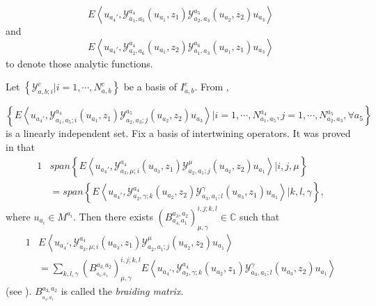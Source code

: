 \documentclass{article}
\begin{document}
	\[
	E\left\langle u_{a_{4}'},\mathcal{Y}_{a_{1},a_{5}}^{a_{4}}\left(u_{a_{1}},z_{1}\right)\mathcal{Y}_{a_{2},a_{3}}^{a_{5}}\left(u_{a_{2}},z_{2}\right)u_{a_{3}}\right\rangle
	\]
	and
	\[
	E\left\langle u_{a_{4}'},\mathcal{Y}_{a_{2},a_{6}}^{a_{4}}\left(u_{a_{1}},z_{2}\right)\mathcal{Y}_{a_{1},a_{3}}^{a_{6}}\left(u_{a_{1}},z_{1}\right)u_{a_{3}}\right\rangle
	\]
	to denote those analytic functions.
	
	Let $\left\{ \mathcal{Y}_{a,b;i}^{c}|i=1,\cdots,N_{a,b}^{c}\right\} $
	be a basis of $I_{a,b}^{c}$. From \cite{H2},
	
	\[
	\left\{ E\left\langle u_{a_{4}'},\mathcal{Y}_{a_{1},a_{5};i}^{a_{4}}\left(u_{a_{1}},z_{1}\right)\mathcal{Y}_{a_{2},a_{3};j}^{a_{5}}\left(u_{a_{2}},z_{2}\right)u_{a_{3}}\right\rangle |i=1,\cdots,N_{a_{1},a_{5}}^{a_{4}},j=1,\cdots,N_{a_{2},a_{3}}^{a_{5}},\forall a_{5}\right\}
	\]
	is a linearly independent set. Fix a basis of intertwining operators.
	It was proved in \cite{KZ,TK} that
	\begin{alignat*}{1}
		& span\left\{ E\left\langle u_{a_{4}'},\mathcal{Y}_{a_{3},\mu;i}^{a_{4}}\left(u_{a_{3}},z_{1}\right)\mathcal{Y}_{a_{2},a_{1};j}^{\mu}\left(u_{a_{2}},z_{2}\right)u_{a_{1}}\right\rangle |i,j,\mu\right\} \\
		& =span\left\{ E\left\langle u_{a_{4}'},\mathcal{Y}_{a_{2},\gamma;k}^{a_{4}}\left(u_{a_{2}},z_{2}\right)\mathcal{Y}_{a_{3},a_{1};l}^{\gamma}\left(u_{a_{3}},z_{1}\right)u_{a_{1}}\right\rangle |k,l,\gamma\right\} ,
	\end{alignat*}
	where $u_{a_{i}}\in M^{a_{i}}$. Then there exists $\left(B_{a_{4,}a_{1}}^{a_{3},a_{2}}\right)_{\mu,\gamma}^{i,j;k,l}\in\mathbb{C}$
	such that
	\begin{alignat}{1}
		& E\left\langle u_{a_{4}'},\mathcal{Y}_{a_{3},\mu;i}^{a_{4}}\left(u_{a_{3}},z_{1}\right)\mathcal{Y}_{a_{2},a_{1};j}^{\mu}\left(u_{a_{2}},z_{2}\right)u_{a_{1}}\right\rangle \nonumber \\
		& =\sum_{k,l,\gamma}\left(B_{_{a_{4},a_{1}}}^{a_{3,}a_{2}}\right)_{\mu,\gamma}^{i,j;k,l}E\left\langle u_{a_{4}'},\mathcal{Y}_{a_{2},\gamma;k}^{a_{4}}\left(u_{a_{2}},z_{1}\right)\mathcal{Y}_{a_{3},a_{1};l}^{\gamma}\left(u_{a_{3}},z_{2}\right)u_{a_{1}}\right\rangle \label{braiding matrix property}
	\end{alignat}
	(see \cite{H1}). $B_{_{a_{4},a_{1}}}^{a_{3,}a_{2}}$ is called
	the\emph{ braiding matrix}.
	
\end{document}

